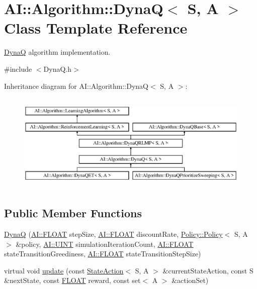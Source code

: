 \hypertarget{classAI_1_1Algorithm_1_1DynaQ}{\section{A\-I\-:\-:Algorithm\-:\-:Dyna\-Q$<$ S, A $>$ Class Template Reference}
\label{classAI_1_1Algorithm_1_1DynaQ}
}


\hyperlink{classAI_1_1Algorithm_1_1DynaQ}{Dyna\-Q} algorithm implementation.  




{\ttfamily \#include $<$Dyna\-Q.\-h$>$}

Inheritance diagram for A\-I\-:\-:Algorithm\-:\-:Dyna\-Q$<$ S, A $>$\-:\begin{figure}[H]
\begin{center}
\leavevmode
\includegraphics[height=4.794520cm]{classAI_1_1Algorithm_1_1DynaQ}
\end{center}
\end{figure}
\subsection*{Public Member Functions}
\begin{DoxyCompactItemize}
\item 
\hyperlink{classAI_1_1Algorithm_1_1DynaQ_aa543816270f72b2c4ac1f77fb818f792}{Dyna\-Q} (\hyperlink{namespaceAI_a41b74884a20833db653dded3918e05c3}{A\-I\-::\-F\-L\-O\-A\-T} step\-Size, \hyperlink{namespaceAI_a41b74884a20833db653dded3918e05c3}{A\-I\-::\-F\-L\-O\-A\-T} discount\-Rate, \hyperlink{classAI_1_1Algorithm_1_1Policy_1_1Policy}{Policy\-::\-Policy}$<$ S, A $>$ \&policy, \hyperlink{namespaceAI_ab6e14dc1e659854858a87e511f1439ec}{A\-I\-::\-U\-I\-N\-T} simulation\-Iteration\-Count, \hyperlink{namespaceAI_a41b74884a20833db653dded3918e05c3}{A\-I\-::\-F\-L\-O\-A\-T} state\-Transition\-Greediness, \hyperlink{namespaceAI_a41b74884a20833db653dded3918e05c3}{A\-I\-::\-F\-L\-O\-A\-T} state\-Transition\-Step\-Size)
\item 
virtual void \hyperlink{classAI_1_1Algorithm_1_1DynaQ_a4542226b17db4ed8a2c5ec17d37dc42f}{update} (const \hyperlink{classAI_1_1StateAction}{State\-Action}$<$ S, A $>$ \&current\-State\-Action, const S \&next\-State, const \hyperlink{namespaceAI_a41b74884a20833db653dded3918e05c3}{F\-L\-O\-A\-T} reward, const set$<$ A $>$ \&action\-Set)
\end{DoxyCompactItemize}
